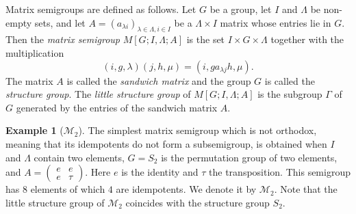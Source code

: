 \documentclass[12pt]{amsart}
\theoremstyle{definition}
\newtheorem{example}[theorem]{Example}
\numberwithin{equation}{section}
\begin{document}
Matrix semigroups are defined as follows.
Let $G$ be a group, let  $I$ and $\Lambda$ be  non-empty sets, and let   
$A = (a_{\lambda i})_{\lambda\in \Lambda,i\in I}$ be a  $\Lambda\times I$ matrix whose entries lie in $G$. Then the  {\em matrix semigroup} $M[G;I,\Lambda;A]$ 
 is the set $I\times G \times  \Lambda$ together with the multiplication
\begin{equation*} (i ,g,\lambda)(j,h,\mu) = (i, g a_{\lambda  j} h,\mu).\end{equation*}
The matrix $A$ is called the {\em sandwich matrix} and the group $G$ is called the {\em structure group}. The {\em little structure group}  of $M[G;I,\Lambda;A]$ is the subgroup $\Gamma$ of $G$ generated by the entries of the sandwich matrix $A$. \begin{example}[$\mathcal M_2$] \label{ex:ex}
The simplest matrix semigroup which is not orthodox, meaning that its idempotents do not form a subsemigroup, is obtained when $I$ and $\Lambda$ contain two elements, $G=S_2$ is the permutation group of two elements, and $A=\begin{pmatrix} e & e \\ e & \tau \end{pmatrix}$. Here $e$ is the identity and $\tau$ the transposition. This semigroup has $8$ elements of which $4$ are idempotents. We denote it by $\mathcal M_2$. Note that the little structure group of $\mathcal M_2$ coincides with the structure group $S_2$.
\end{example}
\end{document}
